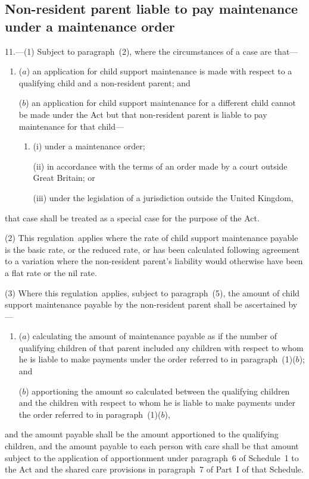 \documentclass[12pt,a4paper]{article}
\begin{document}
\subsection[11. Non-resident parent liable to pay maintenance under a maintenance order]{\sloppy{} Non-resident parent liable to pay maintenance under a maintenance order}

11.---(1)  Subject to paragraph~(2), where the circumstances of a case are that—
\begin{enumerate}\item[]
($a$) an application for child support maintenance is made 
with respect to a qualifying child and a non-resident parent; and

($b$) an application for child support maintenance for a different child cannot be made under the Act but that non-resident parent is liable to pay maintenance 
for that child—
\begin{enumerate}\item[]
    (i) 
    under a maintenance order;

    (ii) 
    in accordance with the terms of an order made by a court outside Great Britain; or

    (iii)
    under the legislation of a jurisdiction outside the United Kingdom,
\end{enumerate}
\end{enumerate}
    that case shall be treated as a special case for the purpose of the Act.

(2) This regulation~applies where the rate of child support maintenance payable is the basic rate, or the reduced rate, or has been calculated following agreement to a variation where the non-resident parent’s liability would otherwise have been a flat rate or the nil rate.

(3) Where this regulation~applies, 
subject to paragraph~(5),  %
the amount of child support maintenance payable by the non-resident parent shall be ascertained by—
\begin{enumerate}\item[]
($a$) calculating the amount of maintenance payable as if the number of qualifying children of that parent included any children with respect to whom he is liable to make payments under the order referred to in paragraph~(1)($b$); and

($b$) apportioning the amount so calculated between the qualifying children and the children with respect to whom he is liable to make payments under the order referred to in paragraph~(1)($b$),
\end{enumerate}
and the amount payable shall be the amount apportioned to the qualifying children, and the amount payable to each person with care shall be that amount subject to the application of apportionment under paragraph~6 of Schedule~1 to the Act and the shared care provisions in paragraph~7 of Part~I of that Schedule.
\end{document}
